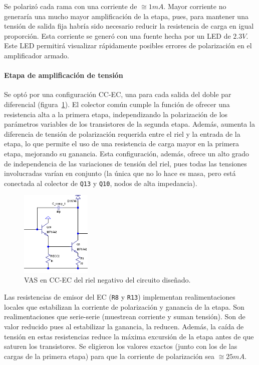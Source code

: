 \documentclass[a4paper,12pt,twoside]{article}
\begin{document}
Se polarizó cada rama con una corriente de $\cong 1mA$. Mayor corriente no generaría una mucho mayor amplificación de la etapa, pues, para mantener una tensión de salida fija habría sido necesario reducir la resistencia de carga en igual proporción. Esta corriente se generó con una fuente hecha por un LED de $2.3V$. Este LED permitirá visualizar rápidamente posibles errores de polarización en el amplificador armado.


\paragraph{Etapa de amplificación de tensión}

Se optó por una configuración CC-EC, una para cada salida del doble par diferencial (figura~\ref{fig:vas-1}). El colector común cumple la función de ofrecer una resistencia alta a la primera etapa, independizando la polarización de los parámetros variables de los transistores de la segunda etapa. Además, aumenta la diferencia de tensión de polarización requerida entre el riel y la entrada de la etapa, lo que permite el uso de una resistencia de carga mayor en la primera etapa, mejorando su ganancia. Esta configuración, además, ofrece un alto grado de independencia de las variaciones de tensión del riel, pues todas las tensiones involucradas varían en conjunto (la única que no lo hace es masa, pero está conectada al colector de \texttt{Q13} y \texttt{Q10}, nodos de alta impedancia). 


\begin{figure}[H]
\centering
\includegraphics[width=0.3\textwidth]{img/sim/vas-1}
\caption{VAS en CC-EC del riel negativo del circuito diseñado.}
\label{fig:vas-1} 
\end{figure}

Las resistencias de emisor del EC (\texttt{R8} y \texttt{R13}) implementan realimentaciones locales que estabilizan la corriente de polarización y ganancia de la etapa. Son realimentaciones que serie-serie (muestrean corriente y suman tensión). Son de valor reducido pues al estabilizar la ganancia, la reducen. Además, la caída de tensión en estas resistencias reduce la máxima excursión de la etapa antes de que saturen los transistores. Se eligieron los valores exactos (junto con los de las cargas de la primera etapa) para que la corriente de polarización sea $\cong 25mA$.
\end{document}
